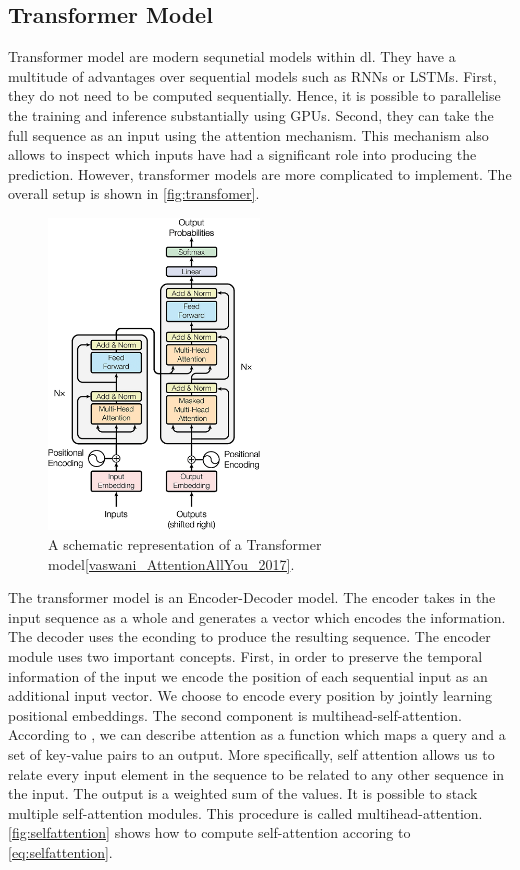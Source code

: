 \documentclass[./../../paper.tex]{subfiles}
\begin{document}
\subsection{Transformer Model}
Transformer model are modern sequnetial models within \gls{dl}. They have a multitude of advantages over sequential models such as \glspl{RNN} or \glspl{LSTM}\needscite{}. First, they do not need to be computed sequentially. Hence, it is possible to parallelise the training and inference substantially using GPUs. Second, they can take the full sequence as an input using the attention mechanism. This mechanism also allows to inspect which inputs have had a significant role into producing the prediction. However, transformer models are more complicated to implement. The overall setup is shown in \autoref{fig:transfomer}.

\begin{figure}[htb]
    \centering
    \includegraphics[width=0.5\textwidth]{figures/transformer.png}
    \caption{A schematic representation of a Transformer model\autoref{vaswani_AttentionAllYou_2017}.}
    \label{fig:transformer}
\end{figure}

The transformer model is an Encoder-Decoder model. The encoder takes in the input sequence as a whole and generates a vector which encodes the information. The decoder uses the econding to produce the resulting sequence. The encoder module uses two important concepts. First, in order to preserve the temporal information of the input we encode the position of each sequential input as an additional input vector. We choose to encode every position by jointly learning  positional embeddings. The second component is multihead-self-attention. According to \citeauthor{vaswani_AttentionAllYou_2017}, we can describe attention as a function which maps a query and a set of key-value pairs to an output. More specifically, self attention allows us to relate every input element in the sequence to be related to any other sequence in the input. The output is a weighted sum of the values. It is possible to stack multiple self-attention modules. This procedure is called multihead-attention. \autoref{fig:selfattention} shows how to compute self-attention accoring to \autoref{eq:selfattention}. 
\end{document}
